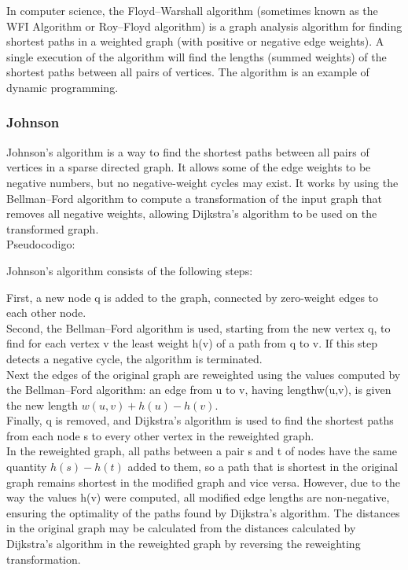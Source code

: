 \documentclass[10pt,letterpaper,twocolumn,twosided]{article}
\newcommand{\codigofuente}[1]{

\dotfill
}
\begin{document}
In computer science, the Floyd–Warshall algorithm (sometimes known as the WFI Algorithm or Roy–Floyd algorithm)
is a graph analysis algorithm for finding shortest paths in a weighted graph (with positive or negative edge weights).
A single execution of the algorithm will find the lengths (summed weights) of the shortest paths between all pairs
of vertices. The algorithm is an example of dynamic programming.

\codigofuente{src/graphs/floydwarshall.cpp}

\subsubsection{Johnson}

Johnson's algorithm is a way to find the shortest paths between all pairs of vertices in a
sparse directed graph. It allows some of the edge weights to be negative numbers, but no 
negative-weight cycles may exist. It works by using the Bellman–Ford algorithm to compute a
transformation of the input graph that removes all negative weights, allowing Dijkstra's algorithm 
to be used on the transformed graph.\\

Pseudocodigo:

Johnson's algorithm consists of the following steps:

First, a new node q is added to the graph, connected by zero-weight edges to each other node.\\

Second, the Bellman–Ford algorithm is used, starting from the new vertex q, to find for each vertex v the 
least weight h(v) of a path from q to v. If this step detects a negative cycle, the algorithm is terminated.\\

Next the edges of the original graph are reweighted using the values computed by the Bellman–Ford algorithm: 
an edge from u to v, having lengthw(u,v), is given the new length $ w(u,v) + h(u) - h(v).$\\

Finally, q is removed, and Dijkstra's algorithm is used to find the shortest paths from each node s to every
other vertex in the reweighted graph.\\

In the reweighted graph, all paths between a pair s and t of nodes have the same quantity $h(s) - h(t)$ added to
them, so a path that is shortest in the original graph remains shortest in the modified graph and vice versa.
However, due to the way the values h(v) were computed, all modified edge lengths are non-negative, ensuring the
optimality of the paths found by Dijkstra's algorithm. The distances in the original graph may be calculated from 
the distances calculated by Dijkstra's algorithm in the reweighted graph by reversing the reweighting transformation.\\
\end{document}
